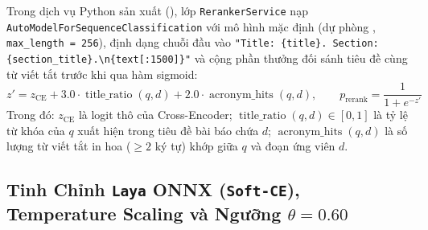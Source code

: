 Trong dịch vụ Python sản xuất (), lớp \texttt{RerankerService} nạp \texttt{AutoModelForSequenceClassification} với mô hình mặc định  (dự phòng , \texttt{max\_length = 256}), định dạng chuỗi đầu vào \texttt{"Title: \{title\}. Section: \{section\_title\}.\textbackslash n\{text[:1500]\}"} và cộng phần thưởng đối sánh tiêu đề cùng từ viết tắt trước khi qua hàm sigmoid:
\begin{equation}
  z' = z_{\text{CE}} + 3.0 \cdot \operatorname{title\_ratio}(q, d) + 2.0 \cdot \operatorname{acronym\_hits}(q, d),
  \qquad
  p_{\text{rerank}} = \frac{1}{1 + e^{-z'}}
  \label{eq:ch4_ce_boost}
\end{equation}
Trong đó: $z_{\text{CE}}$ là logit thô của Cross-Encoder; $\operatorname{title\_ratio}(q, d) \in [0, 1]$ là tỷ lệ từ khóa của $q$ xuất hiện trong tiêu đề bài báo chứa $d$; $\operatorname{acronym\_hits}(q, d)$ là số lượng từ viết tắt in hoa ($\ge 2$ ký tự) khớp giữa $q$ và đoạn ứng viên $d$.

\subsection{\texorpdfstring{Tinh Chỉnh \texttt{Laya} ONNX (\texttt{Soft-CE}), Temperature Scaling và Ngưỡng $\theta = 0.60$}{Tinh Chinh Laya ONNX (Soft-CE), Temperature Scaling va Nguong theta = 0.60}}
\label{sec:ch4_laya_calibration}

